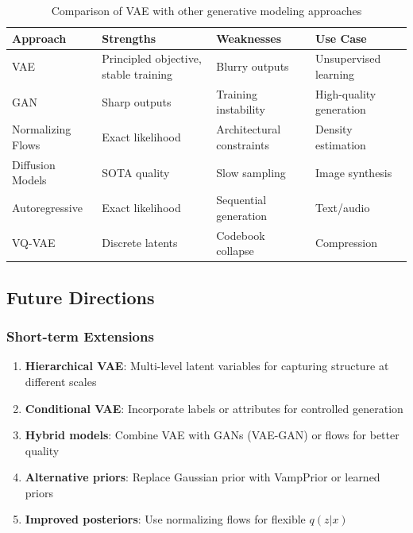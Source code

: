\documentclass[conference]{IEEEtran}
\begin{document}
\begin{table}[H]
\centering
\small
\begin{tabular}{@{}p{2.5cm}p{3cm}p{3cm}p{3.5cm}@{}}
\toprule
\textbf{Approach} & \textbf{Strengths} & \textbf{Weaknesses} & \textbf{Use Case} \\ \midrule
VAE & Principled objective, stable training & Blurry outputs & Unsupervised learning \\
GAN & Sharp outputs & Training instability & High-quality generation \\
Normalizing Flows & Exact likelihood & Architectural constraints & Density estimation \\
Diffusion Models & SOTA quality & Slow sampling & Image synthesis \\
Autoregressive & Exact likelihood & Sequential generation & Text/audio \\
VQ-VAE & Discrete latents & Codebook collapse & Compression \\ \bottomrule
\end{tabular}
\caption{Comparison of VAE with other generative modeling approaches}
\label{tab:generative_comparison}
\end{table}

\subsection{Future Directions}

\subsubsection{Short-term Extensions}

\begin{enumerate}
    \item \textbf{Hierarchical VAE}: Multi-level latent variables for capturing structure at different scales
    
    \item \textbf{Conditional VAE}: Incorporate labels or attributes for controlled generation
    
    \item \textbf{Hybrid models}: Combine VAE with GANs (VAE-GAN) or flows for better quality
    
    \item \textbf{Alternative priors}: Replace Gaussian prior with VampPrior or learned priors
    
    \item \textbf{Improved posteriors}: Use normalizing flows for flexible $q(z|x)$
\end{enumerate}
\end{document}
